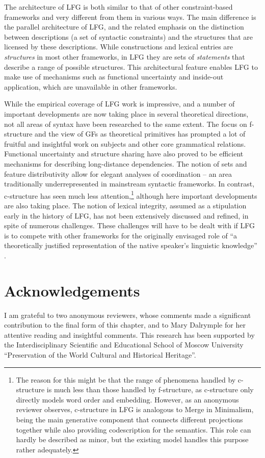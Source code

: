 \documentclass[output=paper,hidelinks]{langscibook}
\begin{document}
 The architecture of LFG is both similar to that of other constraint-based frameworks and very different from them in various ways. The main difference is the parallel architecture of LFG, and the related emphasis on the distinction between descriptions (a set of syntactic constraints) and the structures that are licensed by these descriptions. While constructions and lexical entries are \textit{structures} in most other frameworks, in LFG they are sets of \textit{statements} that describe a range of possible structures. This architectural feature enables LFG to make use of mechanisms such as functional uncertainty and inside-out application, which are unavailable in other frameworks. 
 
 While the empirical coverage of LFG work is impressive, and a number of important developments are now taking place in several theoretical directions, not all areas of syntax have been researched to the same extent. The focus on f-structure and the view of GFs as theoretical primitives has prompted a lot of fruitful and insightful work on subjects and other core grammatical relations. Functional uncertainty and structure sharing have also proved to be efficient mechanisms for describing long-distance dependencies. The notion of sets and feature distributivity allow for elegant analyses of coordination -- an area traditionally underrepresented in mainstream syntactic frameworks. In contrast, c-structure has seen much less attention,\footnote{The reason for this might be that the range of phenomena handled by c-structure is much less than those handled by f-structure, as c-structure only directly models word order and embedding. However, as an anonymous reviewer observes, c-structure in LFG is analogous to Merge in Minimalism, being the main generative component that connects different projections together while also providing codescription for the semantics. This role can hardly be described as minor, but the existing model handles this purpose rather adequately.} although here important developments are also taking place. The notion of lexical integrity, assumed as a stipulation early in the history of LFG, has not been extensively discussed and refined, in spite of numerous challenges. These challenges will have to be dealt with if LFG is to compete with other frameworks for the originally envisaged role of ``a theoretically justified representation of the native speaker's linguistic knowledge'' \parencite{kaplanbresnan82}.
 
\section*{Acknowledgements}

I am grateful to two anonymous reviewers, whose comments made a significant contribution to the final form of this chapter, and to Mary Dalrymple for her attentive reading and insightful comments.  This research has been supported by the Interdisciplinary Scientific and Educational School of Moscow University ``Preservation of the World Cultural and Historical Heritage''.

\sloppy
\printbibliography[heading=subbibliography,notkeyword=this]
\end{document}
